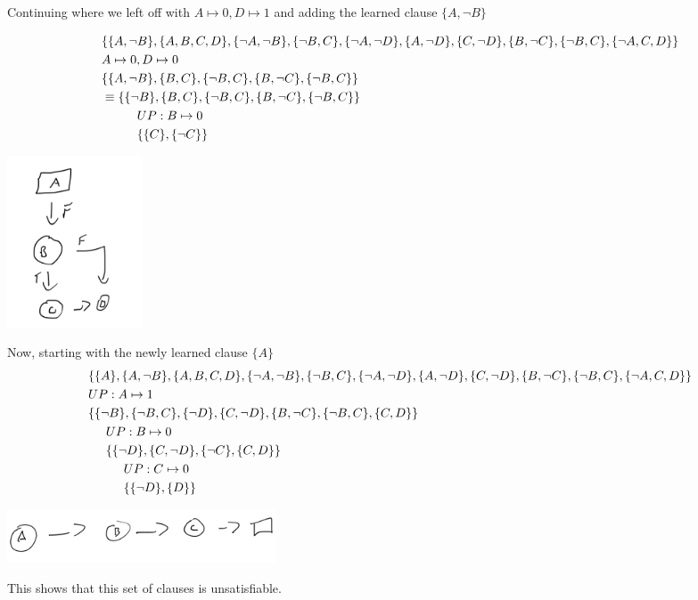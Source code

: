 \documentclass[11pt, letterpaper]{exam}
\newcommand{\tab}{\hspace*{.5cm}}
\begin{document}
\begin{questions}
    Continuing where we left off with $A \mapsto 0, D \mapsto 1$ and adding the learned clause $\{A, \neg B\}$ \

    \begin{align*}
      & \{\{A, \neg B\},\{A,B,C,D\},\{\neg A,\neg B\},\{\neg B, C\},\{\neg A,\neg D\},\{A,\neg D\},\{C,\neg D\},\{B, \neg C\},\{\neg B, C\},\{\neg A, C, D\}\} \\
      & A \mapsto 0, D \mapsto 0 \\
      & \{\{A, \neg B\},\{B,C\},\{\neg B, C\},\{B, \neg C\},\{\neg B, C\}\} \\
      & \equiv \{\{\neg B\},\{B,C\},\{\neg B, C\},\{B, \neg C\},\{\neg B, C\}\} \\
      &   \tab\tab UP: B \mapsto 0 \\
      &   \tab\tab \{\{C\},\{\neg C\}\}
    \end{align*}

    \noindent\includegraphics[width=4cm]{12b}

    Now, starting with the newly learned clause $\{A\}$ \\
    \begin{align*}
      & \{\{A\},\{A, \neg B\},\{A,B,C,D\},\{\neg A,\neg B\},\{\neg B, C\},\{\neg A,\neg D\},\{A,\neg D\},\{C,\neg D\},\{B, \neg C\},\{\neg B, C\},\{\neg A, C, D\}\} \\
      & UP: A \mapsto 1 \\
      & \{\{\neg B\},\{\neg B, C\},\{\neg D\},\{C,\neg D\},\{B, \neg C\},\{\neg B, C\},\{C, D\}\} \\
      &   \tab UP: B \mapsto 0 \\
      &   \tab \{\{\neg D\},\{C,\neg D\},\{\neg C\},\{C, D\}\} \\
      &     \tab\tab UP: C \mapsto 0 \\
      &     \tab\tab \{\{\neg D\},\{D\}\} \\
    \end{align*}

    \noindent\includegraphics[width=8cm]{12c}

    This shows that this set of clauses is unsatisfiable.
  \end{questions}
\end{document}
